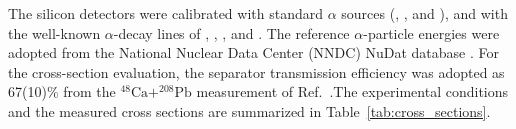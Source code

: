 \documentclass[final,5p,times,twocolumn,number,sort&compress]{elsarticle}
\begin{document}
The silicon detectors were calibrated with standard $\alpha$ sources
(, , and ),
and with the well-known $\alpha$-decay lines of
, , , and .
The reference $\alpha$-particle energies were adopted from
the National Nuclear Data Center (NNDC) NuDat database
\cite{NNDCNuDat}.
For the cross-section evaluation, the separator transmission efficiency was adopted as 67(10)\% from the $^{48}\text{Ca} + ^{208}\text{Pb} $ measurement of Ref.~\cite{zhang2026TargetDetectionSystems}.The experimental conditions and the measured cross sections are summarized in Table~\ref{tab:cross_sections}.
\end{document}
